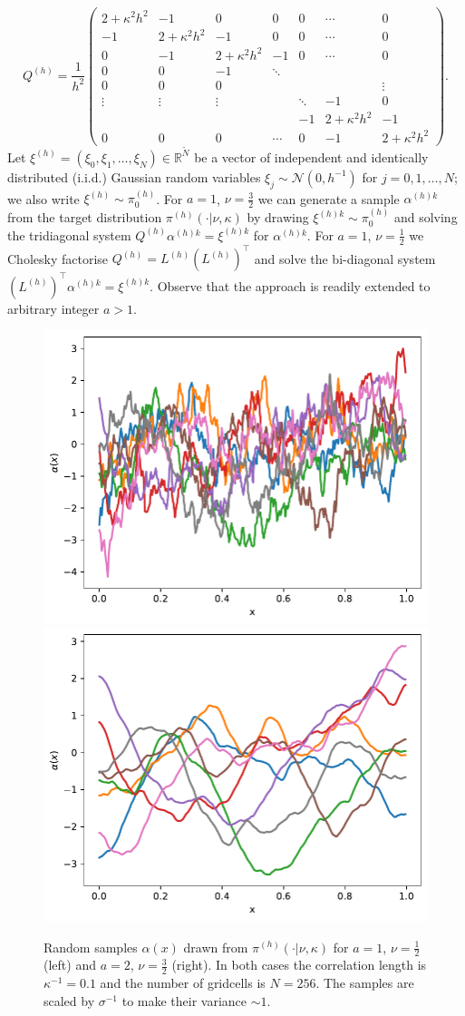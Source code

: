 \documentclass[11pt]{article}
\begin{document}
\begin{equation}
    Q^{(h)} = \frac{1}{h^2}\begin{pmatrix}
        2 +\kappa^2h^2 & -1 & 0 & 0 & 0&\cdots & 0\\
            -1 & 2+\kappa^2h^2 & - 1  & 0 &0& \cdots & 0\\
            0 & -1 & 2+\kappa^2h^2 & - 1 & 0 & \cdots & 0\\
            0 & 0 & -1& \ddots\\
            0&0&0&&&&\vdots\\
            \vdots & \vdots &\vdots&&\ddots &-1 & 0\\
             &  &  & & -1 &  2+\kappa^2h^2 & -1\\
            0 & 0 & 0 & \cdots &0 &  -1  & 2+\kappa^2h^2
    \end{pmatrix}.
\end{equation}
Let $\xi^{(h)}=(\xi_0,\xi_1,\dots,\xi_N)\in\mathbb{R}^{\widetilde{N}}$ be a vector of independent and identically distributed (i.i.d.) Gaussian random variables $\xi_j\sim\mathcal{N}(0,h^{-1})$ for $j=0,1,\dots,N$; we also write $\xi^{(h)}\sim \pi_0^{(h)}$. For $a=1$, $\nu=\frac{3}{2}$ we can generate a sample $\alpha^{(h)k}$ from the target distribution $\pi^{(h)}(\cdot|\nu,\kappa)$ by drawing $\xi^{(h)k}\sim \pi_0^{(h)}$ and solving the tridiagonal system $Q^{(h)}\alpha^{(h)k}=\xi^{(h)k}$ for $\alpha^{(h)k}$. For $a=1$, $\nu=\frac{1}{2}$ we Cholesky factorise $Q^{(h)}=L^{(h)}(L^{(h)})^\top$ and solve the bi-diagonal system $(L^{(h)})^\top\alpha^{(h)k}= \xi^{(h)k}$. Observe that the approach is readily extended to arbitrary integer $a>1$.
\begin{figure}
    \begin{center}
        \includegraphics[width=0.45\linewidth]{figures/samples_nu0_5.pdf}
        \hfill
        \includegraphics[width=0.45\linewidth]{figures/samples_nu1_5.pdf}
    \end{center}
    \caption{Random samples $\alpha(x)$ drawn from $\pi^{(h)}(\cdot|\nu,\kappa)$ for $a=1$, $\nu=\frac{1}{2}$ (left) and $a=2$, $\nu=\frac{3}{2}$ (right). In both cases the correlation length is $\kappa^{-1}=0.1$ and the number of gridcells is $N=256$. The samples are scaled by $\sigma^{-1}$ to make their variance $\sim 1$.}
    \label{fig:random_samples}
\end{figure}
\end{document}
